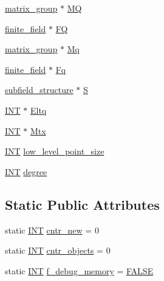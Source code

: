 \begin{DoxyCompactItemize}
\mbox{\hyperlink{classmatrix__group}{matrix\+\_\+group}} $\ast$ \mbox{\hyperlink{classaction__by__subfield__structure_a10c444b8c7f4298b9258350ad4c23bac}{MQ}}
\item 
\mbox{\hyperlink{classfinite__field}{finite\+\_\+field}} $\ast$ \mbox{\hyperlink{classaction__by__subfield__structure_a2046a2732a8ec22f202f1a7114968b10}{FQ}}
\item 
\mbox{\hyperlink{classmatrix__group}{matrix\+\_\+group}} $\ast$ \mbox{\hyperlink{classaction__by__subfield__structure_a5b941974381271dbe0e76e36c5dc664f}{Mq}}
\item 
\mbox{\hyperlink{classfinite__field}{finite\+\_\+field}} $\ast$ \mbox{\hyperlink{classaction__by__subfield__structure_aada606f117514b57a445fa19bcbb6c97}{Fq}}
\item 
\mbox{\hyperlink{classsubfield__structure}{subfield\+\_\+structure}} $\ast$ \mbox{\hyperlink{classaction__by__subfield__structure_a9d33fac6718289617ab300ea9a51ffc7}{S}}
\item 
\mbox{\hyperlink{galois_8h_a09fddde158a3a20bd2dcadb609de11dc}{I\+NT}} $\ast$ \mbox{\hyperlink{classaction__by__subfield__structure_aa90c33b5d5f18bb3d1ccb83037f21767}{Eltq}}
\item 
\mbox{\hyperlink{galois_8h_a09fddde158a3a20bd2dcadb609de11dc}{I\+NT}} $\ast$ \mbox{\hyperlink{classaction__by__subfield__structure_a1747a9342da776bf64e0b01cc927a0a6}{Mtx}}
\item 
\mbox{\hyperlink{galois_8h_a09fddde158a3a20bd2dcadb609de11dc}{I\+NT}} \mbox{\hyperlink{classaction__by__subfield__structure_a747010babae22a9438ae4dc66c86569d}{low\+\_\+level\+\_\+point\+\_\+size}}
\item 
\mbox{\hyperlink{galois_8h_a09fddde158a3a20bd2dcadb609de11dc}{I\+NT}} \mbox{\hyperlink{classaction__by__subfield__structure_ab733b1f5d3defe559b13ffdc6a4f09a4}{degree}}
\end{DoxyCompactItemize}
\subsection*{Static Public Attributes}
\begin{DoxyCompactItemize}
\item 
static \mbox{\hyperlink{galois_8h_a09fddde158a3a20bd2dcadb609de11dc}{I\+NT}} \mbox{\hyperlink{classaction__by__subfield__structure_a26c469d08fdbf30ec586c6a230245c91}{cntr\+\_\+new}} = 0
\item 
static \mbox{\hyperlink{galois_8h_a09fddde158a3a20bd2dcadb609de11dc}{I\+NT}} \mbox{\hyperlink{classaction__by__subfield__structure_ab473f2de66bb7c6670e2ef1a4f70c273}{cntr\+\_\+objects}} = 0
\item 
static \mbox{\hyperlink{galois_8h_a09fddde158a3a20bd2dcadb609de11dc}{I\+NT}} \mbox{\hyperlink{classaction__by__subfield__structure_a9f71b5aae7bffccf17baed25e03c38e2}{f\+\_\+debug\+\_\+memory}} = \mbox{\hyperlink{nauty_8h_aa93f0eb578d23995850d61f7d61c55c1}{F\+A\+L\+SE}}
\end{DoxyCompactItemize}


